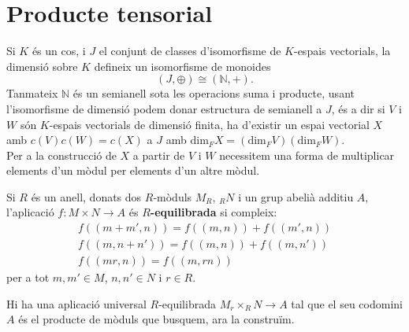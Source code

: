 \section{Producte tensorial}

Si $K$ és un cos, i $J$ el conjunt de classes d'isomorfisme de $K$-espais vectorials, la dimensió sobre $K$ defineix un isomorfisme de monoides $$(J,\oplus) \cong (\mathbb{N},+).$$
\hspace*{.5cm}Tanmateix $\mathbb{N}$ és un semianell sota les operacions suma i producte, usant l'isomorfisme de dimensió podem donar estructura de semianell a $J$, és a dir si $V$ i $W$ són $K$-espais vectorials de dimensió finita, ha d'existir un espai vectorial $X$ amb $c(V)c(W)=c(X)$ a $J$ amb $\text{dim}_FX = (\text{dim}_FV)(\text{dim}_FW)$. \\
\hspace*{.5cm}Per a la construcció de $X$ a partir de $V$ i $W$ necessitem una forma de multiplicar elements d'un mòdul per elements d'un altre mòdul. 

\begin{definition}
Si $R$ és un anell, donats dos $R$-mòduls $M_R$, $_R{N}$ i un grup abelià additiu $A$, l'aplicació $f:M\times N \rightarrow A$ és \textbf{$R$-equilibrada} si compleix:
\begin{eqnarray*}
f((m+m',n))=f((m,n))+f((m',n)) \\
f((m,n+n'))=f((m,n))+f((m,n')) \\
f((mr,n))=f((m,rn))
\end{eqnarray*}
per a tot $m,m'\in M$, $n,n'\in N$ i $r\in R$.

\end{definition}

\indent Hi ha una aplicació universal $R$-equilibrada $M_r \times _R{N} \rightarrow A$ tal que el seu codomini $A$ és el producte de mòduls que busquem, ara la construïm. 

